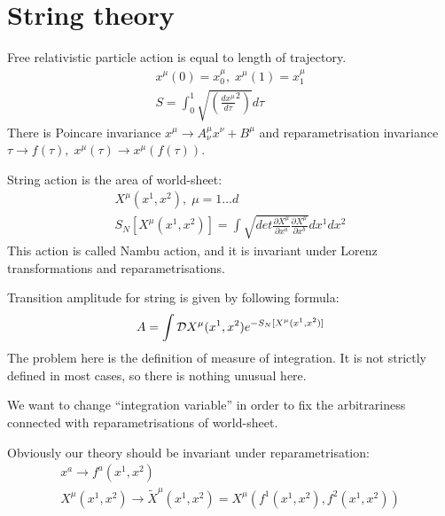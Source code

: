 \documentclass[a4paper,12pt]{article}
\theoremstyle{definition} \newtheorem{Def}{Definition}
\begin{document}
\tableofcontents
\section{String theory}
\label{sec:string-theory}

Free relativistic particle action is equal to length of trajectory. 
\begin{equation}
  \label{eq:1}
  \begin{split}
  x^{\mu}(0)=x^{\mu}_0,\; x^{\mu}(1)=x^{\mu}_1\\
  S=\int_{0}^{1} \sqrt{\left(\frac{dx^{\mu}}{d\tau}^2\right)}d\tau
\end{split}
\end{equation}
There is Poincare invariance $x^{\mu}\to A^{\mu}_{\nu}x^{\nu}+ B^{\mu}$ and reparametrisation invariance $\tau\to f(\tau),\; x^{\mu}(\tau)\to x^{\mu}(f(\tau))$.

String action is the area of world-sheet:
\begin{equation}
  \label{eq:2}
  \begin{split}
    X^{\mu}(x^1,x^2),\; \mu=1\dots d\\
    S_N [X^{\mu}(x^1,x^2)]=\int \sqrt{det \frac{\partial X^{\mu}}{\partial x^a}\frac{\partial X^{\mu}}{\partial x^b}} dx^1 dx^2
  \end{split}
\end{equation}
This action is called Nambu action, and it is invariant under Lorenz transformations and reparametrisations. 

Transition amplitude for string is given by following formula:
\begin{equation}
  \label{eq:3}
  A=\int {\cal D}X^{\mu}(x^1,x^2)e^{-S_N[X^{\mu}(x^1,x^2)]}
\end{equation}
The problem here is the definition of measure of integration. 
It is not strictly defined in most cases, so there is nothing unusual here.

We want to change ``integration variable'' in order to fix the arbitrariness connected with reparametrisations of world-sheet.

Obviously our theory should be invariant under reparametrisation:
\begin{equation}
  \label{eq:4}
  \begin{split}
    x^a \to f^a (x^1,x^2)\\
    X^{\mu}(x^1,x^2)\to \tilde{X}^{\mu}(x^1,x^2)=X^{\mu}(f^1(x^1,x^2),f^2(x^1,x^2))
  \end{split}
\end{equation}
\end{document}
